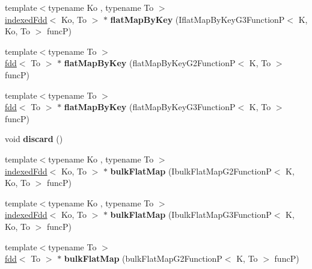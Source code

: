 \begin{DoxyCompactItemize}
\item 
\hypertarget{classfaster_1_1groupedFdd_a30a78832f8adb812a4cf8e066a810694}{}\label{classfaster_1_1groupedFdd_a30a78832f8adb812a4cf8e066a810694} 
{\footnotesize template$<$typename Ko , typename To $>$ }\\\hyperlink{classfaster_1_1indexedFdd}{indexed\+Fdd}$<$ Ko, To $>$ $\ast$ {\bfseries flat\+Map\+By\+Key} (Iflat\+Map\+By\+Key\+G3\+FunctionP$<$ K, Ko, To $>$ funcP)
\item 
\hypertarget{classfaster_1_1groupedFdd_ac04b3eda45e06a5d8ebaec16fd3e7df2}{}\label{classfaster_1_1groupedFdd_ac04b3eda45e06a5d8ebaec16fd3e7df2} 
{\footnotesize template$<$typename To $>$ }\\\hyperlink{classfaster_1_1fdd}{fdd}$<$ To $>$ $\ast$ {\bfseries flat\+Map\+By\+Key} (flat\+Map\+By\+Key\+G2\+FunctionP$<$ K, To $>$ funcP)
\item 
\hypertarget{classfaster_1_1groupedFdd_ace8e2aba0c083f8f2c0ac1a949521edf}{}\label{classfaster_1_1groupedFdd_ace8e2aba0c083f8f2c0ac1a949521edf} 
{\footnotesize template$<$typename To $>$ }\\\hyperlink{classfaster_1_1fdd}{fdd}$<$ To $>$ $\ast$ {\bfseries flat\+Map\+By\+Key} (flat\+Map\+By\+Key\+G3\+FunctionP$<$ K, To $>$ funcP)
\item 
\hypertarget{classfaster_1_1groupedFdd_abfbee9b73e344e5fd6f44a209f6c1762}{}\label{classfaster_1_1groupedFdd_abfbee9b73e344e5fd6f44a209f6c1762} 
void {\bfseries discard} ()
\item 
\hypertarget{classfaster_1_1groupedFdd_ad1fb70f835dd2e1fa59c2e5e616b545a}{}\label{classfaster_1_1groupedFdd_ad1fb70f835dd2e1fa59c2e5e616b545a} 
{\footnotesize template$<$typename Ko , typename To $>$ }\\\hyperlink{classfaster_1_1indexedFdd}{indexed\+Fdd}$<$ Ko, To $>$ $\ast$ {\bfseries bulk\+Flat\+Map} (Ibulk\+Flat\+Map\+G2\+FunctionP$<$ K, Ko, To $>$ funcP)
\item 
\hypertarget{classfaster_1_1groupedFdd_a3278e79b7930b60a9b7270442f5dd7fa}{}\label{classfaster_1_1groupedFdd_a3278e79b7930b60a9b7270442f5dd7fa} 
{\footnotesize template$<$typename Ko , typename To $>$ }\\\hyperlink{classfaster_1_1indexedFdd}{indexed\+Fdd}$<$ Ko, To $>$ $\ast$ {\bfseries bulk\+Flat\+Map} (Ibulk\+Flat\+Map\+G3\+FunctionP$<$ K, Ko, To $>$ funcP)
\item 
\hypertarget{classfaster_1_1groupedFdd_a928ef7d6b2bbe1d07cfbb6fed1f9e858}{}\label{classfaster_1_1groupedFdd_a928ef7d6b2bbe1d07cfbb6fed1f9e858} 
{\footnotesize template$<$typename To $>$ }\\\hyperlink{classfaster_1_1fdd}{fdd}$<$ To $>$ $\ast$ {\bfseries bulk\+Flat\+Map} (bulk\+Flat\+Map\+G2\+FunctionP$<$ K, To $>$ funcP)

\end{DoxyCompactItemize}
